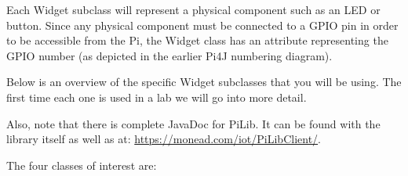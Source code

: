 Each Widget subclass will represent a physical component such as an LED or button. Since any physical component must be connected to a GPIO pin in order to be accessible from the Pi, the Widget class has an attribute representing the GPIO number (as depicted in the earlier Pi4J numbering diagram).

Below is an overview of the specific Widget subclasses that you will be using. The first time each one is used in a lab we will go into more detail.

Also, note that there is complete JavaDoc for PiLib. It can be found with the library itself as well as at:  \url{https://monead.com/iot/PiLibClient/}.


The four classes of interest are:

